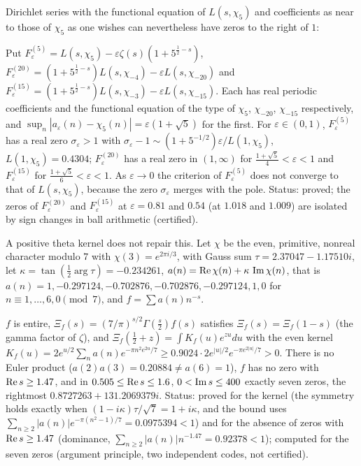 Dirichlet series with the functional equation of $L(s,\chi_5)$ and coefficients as near to those of $\chi_5$ as one wishes can nevertheless have zeros to the right of $1$:

\begin{theorem}\label{rg:thm:nearmiss}
Put $F^{(5)}_\varepsilon=L(s,\chi_5)-\varepsilon\zeta(s)(1+5^{\frac12-s})$, $F^{(20)}_\varepsilon=(1+5^{\frac12-s})L(s,\chi_{-4})-\varepsilon L(s,\chi_{-20})$ and $F^{(15)}_\varepsilon=(1+5^{\frac12-s})L(s,\chi_{-3})-\varepsilon L(s,\chi_{-15})$. Each has real periodic coefficients and the functional equation of the type of $\chi_5$, $\chi_{-20}$, $\chi_{-15}$ respectively, and $\sup_n|a_\varepsilon(n)-\chi_5(n)|=\varepsilon(1+\sqrt5)$ for the first. For $\varepsilon\in(0,1)$, $F^{(5)}_\varepsilon$ has a real zero $\sigma_\varepsilon>1$ with $\sigma_\varepsilon-1\sim(1+5^{-1/2})\varepsilon/L(1,\chi_5)$, $L(1,\chi_5)=0.4304$; $F^{(20)}_\varepsilon$ has a real zero in $(1,\infty)$ for $\frac{1+\sqrt5}4<\varepsilon<1$ and $F^{(15)}_\varepsilon$ for $\frac{1+\sqrt5}6<\varepsilon<1$. As $\varepsilon\to0$ the criterion of $F^{(5)}_\varepsilon$ does not converge to that of $L(s,\chi_5)$, because the zero $\sigma_\varepsilon$ merges with the pole. Status: proved; the zeros of $F^{(20)}_\varepsilon$ and $F^{(15)}_\varepsilon$ at $\varepsilon=0.81$ and $0.54$ (at $1.018$ and $1.009$) are isolated by sign changes in ball arithmetic (certified).
\end{theorem}

A positive theta kernel does not repair this. Let $\chi$ be the even, primitive, nonreal character modulo $7$ with $\chi(3)=e^{2\pi i/3}$, with Gauss sum $\tau=2.37047-1.17510i$, let $\kappa=\tan(\frac12\arg\tau)=-0.234261$, $a(n)=\operatorname{Re}\chi(n)+\kappa\,\operatorname{Im}\chi(n)$, that is $a(n)=1,-0.297124,-0.702876,-0.702876,-0.297124,1,0$ for $n\equiv1,\dots,6,0\pmod 7$, and $f=\sum a(n)n^{-s}$.

\begin{theorem}\label{rg:thm:cond7}
$f$ is entire, $\Xi_f(s)=(7/\pi)^{s/2}\Gamma(\frac s2)f(s)$ satisfies $\Xi_f(s)=\Xi_f(1-s)$ (the gamma factor of $\zeta$), and $\Xi_f(\frac12+z)=\int K_f(u)e^{zu}du$ with the even kernel $K_f(u)=2e^{u/2}\sum_na(n)e^{-\pi n^2e^{2u}/7}\ge0.9024\cdot2e^{|u|/2}e^{-\pi e^{2|u|}/7}>0$. There is no Euler product ($a(2)a(3)=0.20884\ne a(6)=1$), $f$ has no zero with $\operatorname{Re} s\ge1.47$, and in $0.505\le\operatorname{Re} s\le1.6$, $0<\operatorname{Im} s\le400$ exactly seven zeros, the rightmost $0.8727263+131.2069379i$. Status: proved for the kernel (the symmetry holds exactly when $(1-i\kappa)\tau/\sqrt7=1+i\kappa$, and the bound uses $\sum_{n\ge2}|a(n)|e^{-\pi(n^2-1)/7}=0.0975394<1$) and for the absence of zeros with $\operatorname{Re} s\ge1.47$ (dominance, $\sum_{n\ge2}|a(n)|n^{-1.47}=0.92378<1$); computed for the seven zeros (argument principle, two independent codes, not certified).
\end{theorem}

